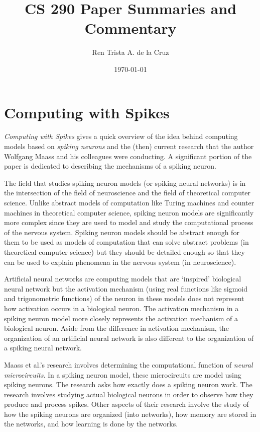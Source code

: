 \documentclass[12pt,A4]{article}
\title
{
   CS 290 Paper Summaries and Commentary
}
\author
{
   Ren Trista A. de la Cruz
}
\date
{
   \today
}
\begin{document}
\maketitle


\section*{Computing with Spikes}

\emph{Computing with Spikes} \cite{maass-2002-comp-spike} gives a quick overview of the idea behind 
computing models based on \emph{spiking neurons} and the (then) current research that the author
Wolfgang Maass and his colleagues were conducting. A significant portion of the paper is dedicated
to describing the mechanisms of a spiking neuron.

The field that studies spiking neuron models (or spiking neural networks) is in the intersection of 
the field of neuroscience and the field of theoretical computer science. Unlike abstract models of 
computation like Turing  machines and counter machines in theoretical computer science, spiking 
neuron models are significantly more complex since they are used to model and study the
computational process of the nervous system. Spiking neuron models should be abstract enough for 
them to be used as models of computation that can solve abstract problems (in theoretical computer
science) but they should be detailed enough so that they can be used to explain phenomena in the
nervous system (in neuroscience).

Artificial neural networks are computing models that are `inspired' biological neural network but the 
activation mechanism (using real functions like sigmoid and trigonometric functions) of the neuron 
in these models does not represent how activation occurs in a biological neuron. The activation 
mechanism in a spiking neuron model more closely represents the activation mechanism of a biological 
neuron. Aside from the difference in activation mechanism, the organization of an artificial neural 
network is also different to the organization of a spiking neural network.  

Maass et al.'s research involves determining the computational function of \emph{neural 
microcircuits}. In a spiking neuron model, these microcircuits are model using spiking neurons. The 
research asks how exactly does a spiking neuron work. The research involves studying actual
biological neurons in order to observe how they produce and process spikes. Other aspects of their 
research involve the study of how the spiking neurons are organized (into networks), how memory are
stored in the networks, and how learning is done by the networks. 
\end{document}
